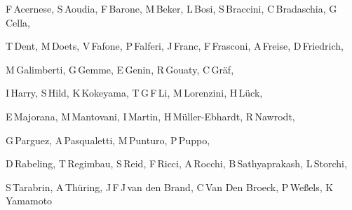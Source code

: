 F\,Acernese,
S\,Aoudia,
F\,Barone,
M\,Beker,
L\,Bosi,
S\,Braccini,
C\,Bradaschia,
G\,Cella, \par
T\,Dent,
M\,Doets,
V\,Fafone,
P\,Falferi,
J\,Franc,
F\,Frasconi,
A\,Freise,
D\,Friedrich, \par
M\,Galimberti,
G\,Gemme,
E\,Genin,
R\,Gouaty,
C\,Gr\"{a}f, \par
I\,Harry,
S\,Hild,
K\,Kokeyama,
T\,G\,F\,Li,
M\,Lorenzini,
H\,L\"{u}ck, \par
E\,Majorana,
M\,Mantovani,
I\,Martin,
H\,M\"{u}ller-Ebhardt,
R\,Nawrodt, \par
G\,Parguez,  
A\,Pasqualetti,
M\,Punturo,
P\,Puppo, \par
D\,Rabeling,
T\,Regimbau,
S\,Reid,
F\,Ricci,
A\,Rocchi,
B\,Sathyaprakash, 
L\,Storchi, \par
S\,Tarabrin,
A\,Th\"{u}ring,
J\,F\,J\,van den Brand,
C\,Van Den Broeck,
P\,We{\ss}els,
K\,Yamamoto\par 
